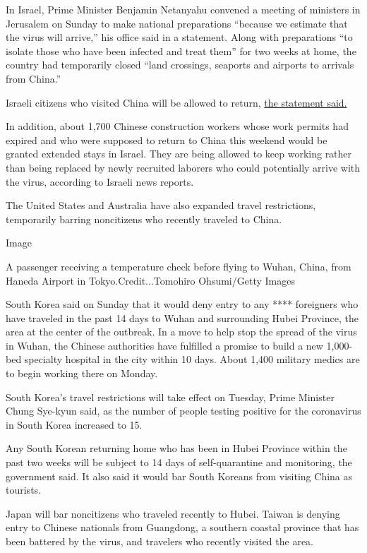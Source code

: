 In Israel, Prime Minister Benjamin Netanyahu convened a meeting of
ministers in Jerusalem on Sunday to make national preparations ``because
we estimate that the virus will arrive,'' his office said in a
statement. Along with preparations ``to isolate those who have been
infected and treat them'' for two weeks at home, the country had
temporarily closed ``land crossings, seaports and airports to arrivals
from China.''

Israeli citizens who visited China will be allowed to return,
\href{https://twitter.com/IsraeliPM/status/1223971839099187200}{the
statement said.}

In addition, about 1,700 Chinese construction workers whose work permits
had expired and who were supposed to return to China this weekend would
be granted extended stays in Israel. They are being allowed to keep
working rather than being replaced by newly recruited laborers who could
potentially arrive with the virus, according to Israeli news reports.

The United States and Australia have also expanded travel restrictions,
temporarily barring noncitizens who recently traveled to China.

Image

A passenger receiving a temperature check before flying to Wuhan, China,
from Haneda Airport in Tokyo.Credit...Tomohiro Ohsumi/Getty Images

South Korea said on Sunday that it would deny entry to any ****
foreigners who have traveled in the past 14 days to Wuhan and
surrounding Hubei Province, the area at the center of the outbreak. In a
move to help stop the spread of the virus in Wuhan, the Chinese
authorities have fulfilled a promise to build a new 1,000-bed specialty
hospital in the city within 10 days. About 1,400 military medics are to
begin working there on Monday.

South Korea's travel restrictions will take effect on Tuesday, Prime
Minister Chung Sye-kyun said, as the number of people testing positive
for the coronavirus in South Korea increased to 15.

Any South Korean returning home who has been in Hubei Province within
the past two weeks will be subject to 14 days of self-quarantine and
monitoring, the government said. It also said it would bar South Koreans
from visiting China as tourists.

Japan will bar noncitizens who traveled recently to Hubei. Taiwan is
denying entry to Chinese nationals from Guangdong, a southern coastal
province that has been battered by the virus, and travelers who recently
visited the area.


